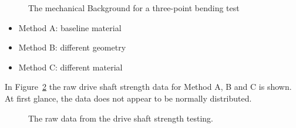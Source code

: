 \documentclass[
  a4paper,
]{scrbook}
\providecommand{\tightlist}{%
  \setlength{\itemsep}{0pt}\setlength{\parskip}{0pt}}\usepackage{longtable,booktabs,array}
\begin{document}
\begin{figure}[H]


\caption{\label{fig-kruskal-three-point}The mechanical Background for a
three-point bending test}

\end{figure}%

\begin{itemize}
\tightlist
\item
  Method A: baseline material
\item
  Method B: different geometry
\item
  Method C: different material
\end{itemize}

In Figure~\ref{fig-kruskal-raw-dat} the raw drive shaft strength data
for Method A, B and C is shown. At first glance, the data does not
appear to be normally distributed.

\begin{figure}[H]


\caption{\label{fig-kruskal-raw-dat}The raw data from the drive shaft
strength testing.}

\end{figure}%
\end{document}
